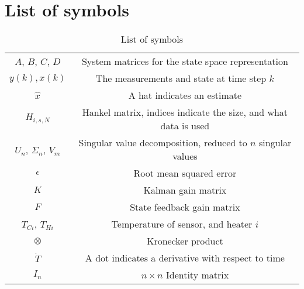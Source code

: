 \section{List of symbols}
\begin{table}[ht]
    \centering
    \caption{List of symbols}
    \begin{tabular}{c|c}
         $A$, $B$, $C$, $D$  & System matrices for the state space representation \\
         $y(k), x(k)$ & The measurements and state at time step $k$\\
         $\hat{x}$ & A hat indicates an estimate\\
         $H_{i,s,N}$ & Hankel matrix, indices indicate the size, and what data is used \\
         $U_n$, $\Sigma_n$, $V_m$ & Singular value decomposition, reduced to $n$ singular values\\
         $\epsilon$ & Root mean squared error \\
         $K$ & Kalman gain matrix\\
         $F$ & State feedback gain matrix\\
         $T_{Ci}$, $T_{Hi}$ & Temperature of sensor, and heater $i$\\
         $\otimes$ & Kronecker product \\
         $\dot{T}$ & A dot indicates a derivative with respect to time \\
         $I_n$ & $n\times n$ Identity matrix
    \end{tabular}
    \label{tab:symbols}
\end{table}